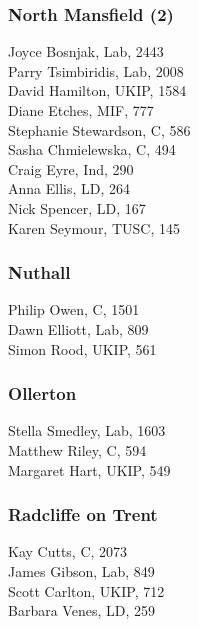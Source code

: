 \documentclass[a4paper,openany,10pt]{book}
\begin{document}
\subsubsection*{North Mansfield (2)}



Joyce Bosnjak, Lab, 2443\\
Parry Tsimbiridis, Lab, 2008\\
David Hamilton, UKIP, 1584\\
Diane Etches, MIF, 777\\
Stephanie Stewardson, C, 586\\
Sasha Chmielewska, C, 494\\
Craig Eyre, Ind, 290\\
Anna Ellis, LD, 264\\
Nick Spencer, LD, 167\\
Karen Seymour, TUSC, 145\\


\subsubsection*{Nuthall}



Philip Owen, C, 1501\\
Dawn Elliott, Lab, 809\\
Simon Rood, UKIP, 561\\


\subsubsection*{Ollerton}



Stella Smedley, Lab, 1603\\
Matthew Riley, C, 594\\
Margaret Hart, UKIP, 549\\


\subsubsection*{Radcliffe on Trent}



Kay Cutts, C, 2073\\
James Gibson, Lab, 849\\
Scott Carlton, UKIP, 712\\
Barbara Venes, LD, 259\\
\end{document}
